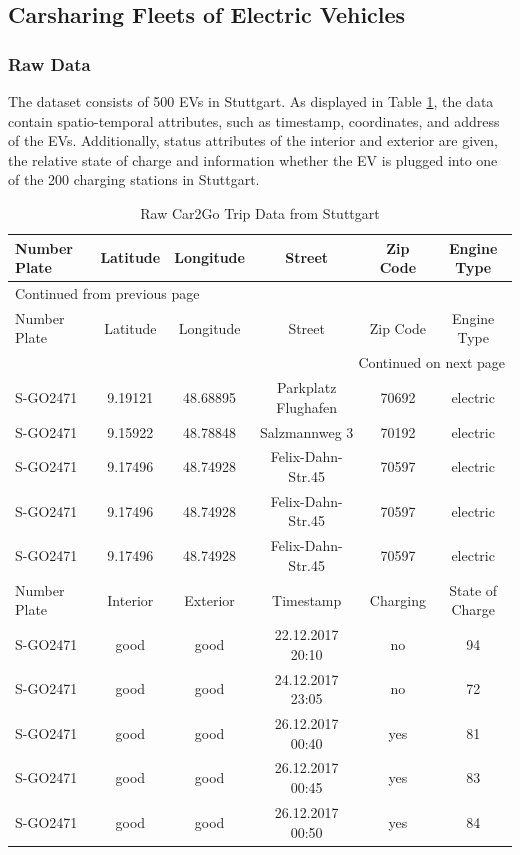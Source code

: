\documentclass[a4paper, twoside, 12pt]{article}
\begin{document}
\subsection{Carsharing Fleets of Electric Vehicles}
\label{sec:orgf23f249}
\subsubsection{Raw Data}
\label{sec:orgd5f1589}
The dataset consists of 500 EVs in Stuttgart. As displayed in Table
\ref{car2go-sample-data}, the data contain spatio-temporal attributes, such as
timestamp, coordinates, and address of the EVs. Additionally, status attributes
of the interior and exterior are given, the relative state of charge and
information whether the EV is plugged into one of the 200 charging stations in
Stuttgart.

\begin{longtable}{l|ccccc}
\caption{Raw Car2Go Trip Data from Stuttgart \label{car2go-sample-data}}
\\
\hline
\hline
Number Plate & Latitude & Longitude & Street & Zip Code & Engine Type\\
\hline
\endfirsthead
\multicolumn{6}{l}{Continued from previous page} \\
\hline

Number Plate & Latitude & Longitude & Street & Zip Code & Engine Type \\

\hline
\endhead
\hline\multicolumn{6}{r}{Continued on next page} \\
\endfoot
\endlastfoot
\hline
S-GO2471 & 9.19121 & 48.68895 & Parkplatz Flughafen & 70692 & electric\\
S-GO2471 & 9.15922 & 48.78848 & Salzmannweg 3 & 70192 & electric\\
S-GO2471 & 9.17496 & 48.74928 & Felix-Dahn-Str.45 & 70597 & electric\\
S-GO2471 & 9.17496 & 48.74928 & Felix-Dahn-Str.45 & 70597 & electric\\
S-GO2471 & 9.17496 & 48.74928 & Felix-Dahn-Str.45 & 70597 & electric\\
\hline
Number Plate & Interior & Exterior & Timestamp & Charging & State of Charge\\
\hline
S-GO2471 & good & good & 22.12.2017 20:10 & no & 94\\
S-GO2471 & good & good & 24.12.2017 23:05 & no & 72\\
S-GO2471 & good & good & 26.12.2017 00:40 & yes & 81\\
S-GO2471 & good & good & 26.12.2017 00:45 & yes & 83\\
S-GO2471 & good & good & 26.12.2017 00:50 & yes & 84\\
\hline
\hline
\end{longtable}
\end{document}
